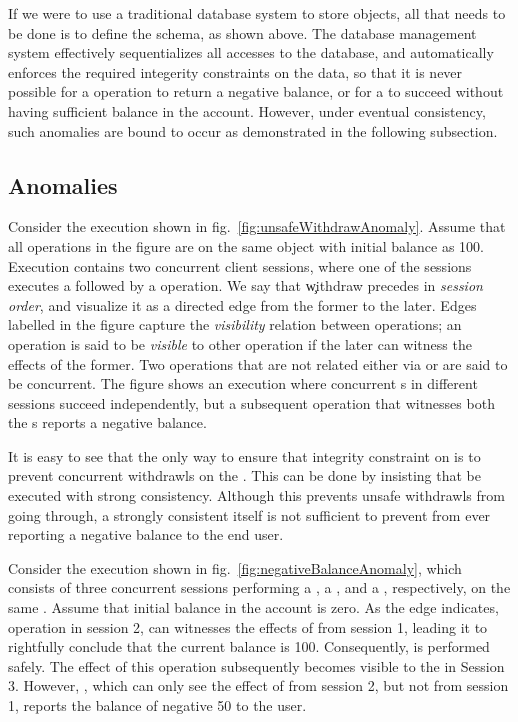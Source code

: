 If we were to use a traditional database system to store
 objects, all that needs to be done is to define the
 schema, as shown above. The database management
system effectively sequentializes all accesses to the database, and
automatically enforces the required integerity constraints on the
data, so that it is never possible for a  operation to
return a negative balance, or for a  to succeed without
having sufficient balance in the account. However, under eventual
consistency, such anomalies are bound to occur as demonstrated in the
following subsection. 


\subsection{Anomalies}

Consider the execution shown in fig.~\ref{fig:unsafeWithdrawAnomaly}.
Assume that all operations in the figure are on the same
 object with initial balance as 100. Execution
contains two concurrent client sessions, where one of the sessions
executes a  followed by a  operation. We
say that \c{withdraw} precedes  in \emph{session
order}, and visualize it as a directed  edge from the former to
the later. Edges labelled  in the figure capture the
\emph{visibility} relation between operations; an operation is said to
be \emph{visible} to other operation if the later can witness the
effects of the former. Two operations that are not related either via
 or  are said to be concurrent. The figure shows an
execution where concurrent s in different sessions
succeed independently, but a subsequent  operation that
witnesses both the s reports a negative balance. 

It is easy to see that the only way to ensure that integrity
constraint on  is to prevent concurrent withdrawls on the
. This can be done by insisting that  be
executed with strong consistency. Although this prevents unsafe
withdrawls from going through, a strongly consistent 
itself is not sufficient to prevent  from ever
reporting a negative balance to the end user.

Consider the execution shown in fig.~\ref{fig:negativeBalanceAnomaly},
which consists of three concurrent sessions performing a ,
a , and a , respectively, on the same
. Assume that initial balance in the account is zero.
As the  edge indicates, operation  in session
2, can witnesses the effects of  from session 1,
leading it to rightfully conclude that the current balance is 100.
Consequently,  is performed safely. The effect of
this  operation subsequently becomes visible to the
 in Session 3. However, , which can only
see the effect of  from session 2, but not 
from session 1, reports the balance of negative 50 to the user.

